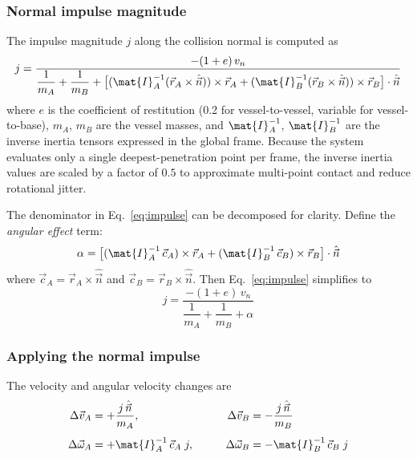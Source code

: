\documentclass[Orbiter Technical Reference.tex]{subfiles}
\begin{document}
\subsubsection{Normal impulse magnitude}
The impulse magnitude $j$ along the collision normal is computed as
\begin{equation}
j = \frac{-(1+e)\,v_n}
     {\dfrac{1}{m_A} + \dfrac{1}{m_B}
      + \bigl[(\mat{I}_A^{-1}(\vec{r}_A \times \hat{\vec{n}})) \times \vec{r}_A
        + (\mat{I}_B^{-1}(\vec{r}_B \times \hat{\vec{n}})) \times \vec{r}_B\bigr]
        \cdot \hat{\vec{n}}}
\label{eq:impulse}
\end{equation}
where $e$ is the coefficient of restitution (0.2 for vessel-to-vessel,
variable for vessel-to-base), $m_A$, $m_B$ are the vessel masses, and
$\mat{I}_A^{-1}$, $\mat{I}_B^{-1}$ are the inverse inertia tensors
expressed in the global frame.
Because the system evaluates only a single deepest-penetration point
per frame, the inverse inertia values are scaled by a factor of $0.5$
to approximate multi-point contact and reduce rotational jitter.

The denominator in Eq.~\ref{eq:impulse} can be decomposed for clarity.
Define the \emph{angular effect} term:
\begin{equation}
\alpha = \bigl[(\mat{I}_A^{-1}\,\vec{c}_A) \times \vec{r}_A
         + (\mat{I}_B^{-1}\,\vec{c}_B) \times \vec{r}_B\bigr]
         \cdot \hat{\vec{n}}
\label{eq:angular_effect}
\end{equation}
where $\vec{c}_A = \vec{r}_A \times \hat{\vec{n}}$ and
$\vec{c}_B = \vec{r}_B \times \hat{\vec{n}}$.
Then Eq.~\ref{eq:impulse} simplifies to
\begin{equation}
j = \frac{-(1+e)\,v_n}{\dfrac{1}{m_A} + \dfrac{1}{m_B} + \alpha}
\label{eq:impulse_simple}
\end{equation}

\subsubsection{Applying the normal impulse}
The velocity and angular velocity changes are
\begin{equation}
\begin{aligned}
\Delta\vec{v}_A &= +\frac{j\,\hat{\vec{n}}}{m_A}, &\qquad
\Delta\vec{v}_B &= -\frac{j\,\hat{\vec{n}}}{m_B} \\[4pt]
\Delta\vec{\omega}_A &= +\mat{I}_A^{-1}\,\vec{c}_A\;j, &\qquad
\Delta\vec{\omega}_B &= -\mat{I}_B^{-1}\,\vec{c}_B\;j
\end{aligned}
\label{eq:apply_impulse}
\end{equation}
\end{document}

